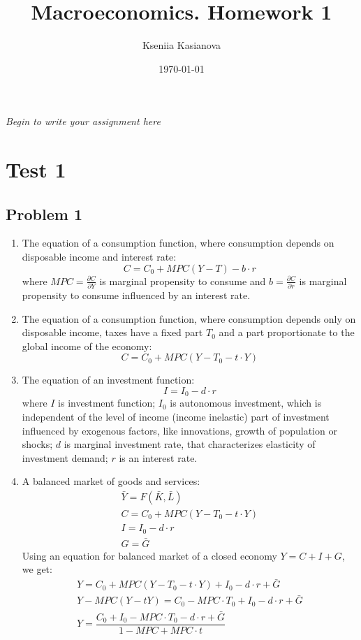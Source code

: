 \documentclass[a4paper,12pt]{article} %
\author{Kseniia Kasianova}
\title{Macroeconomics. Homework 1}
\date{\today}
\newcommand{\latinword}[1]{\textsf{\itshape #1}}%
\begin{document}
{\color{blue} \latinword{Begin to write your assignment here}}

\noindent\makebox[\linewidth]{\rule{\textwidth}{0.4pt}}


\section*{Test 1}
\subsection*{Problem 1}

\begin{enumerate}[label=\alph*)]
	\item 
The equation of a consumption function, where consumption depends on disposable income and interest rate:
\[  C=C_0+MPC(Y-T) - b \cdot r  \] 
where $ MPC = \frac{\partial C}{\partial Y} $ is marginal propensity to consume and $ b = \frac{\partial C}{\partial r} $ is marginal propensity to consume influenced by an interest rate.   

\item  The equation of a consumption function, where consumption depends only on disposable
income, taxes have a fixed part $ T_{0} $ and a part proportionate to the global income of the economy:
\[  C=C_0+MPC(Y-T_{0}-t \cdot Y)  \]

\item  The equation of an investment function:
 \[ I=I_{0}-d \cdot r \] 
 where $ I $ is investment function; $ I_{0} $ is autonomous investment, which is independent of the level of income (income inelastic) part of investment influenced by exogenous factors, like innovations, growth of population or shocks; $ d $  is marginal investment rate, that characterizes elasticity of investment demand; $ r $ is an interest rate.     
 
\item  A balanced market of goods and services: 
\begin{gather*}
\bar{Y} = F(\bar{K},\bar{L})\\
C=C_0+MPC(Y-T_{0}-t \cdot Y) \\
I=I_{0}-d \cdot r\\
G=\bar{G}
\end{gather*}
Using an equation for balanced market of a closed economy $ Y=C+I+G $, we get: 
\begin{gather*}
Y=C_0+MPC(Y-T_{0}-t\cdot Y) + I_{0}-d \cdot r + \bar{G}\\
Y-MPC(Y-tY)=C_0-MPC \cdot T_{0} + I_{0}-d\cdot r + \bar{G}\\
Y=\dfrac{C_0+ I_{0}-MPC \cdot T_{0} -d\cdot r + \bar{G}}{1-MPC+MPC\cdot t}
\end{gather*}


\end{enumerate}
\end{document}
